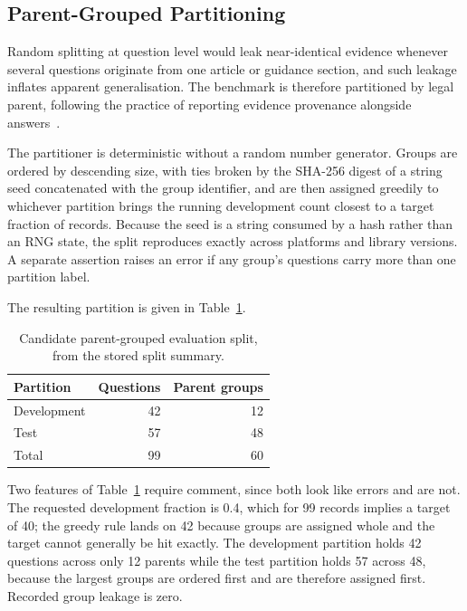 \subsection{Parent-Grouped Partitioning}

Random splitting at question level would leak near-identical evidence whenever several questions originate from one article or guidance section, and such leakage inflates apparent generalisation. The benchmark is therefore partitioned by legal parent, following the practice of reporting evidence provenance alongside answers~\cite{petroni2021kilt}.

The partitioner is deterministic without a random number generator. Groups are ordered by descending size, with ties broken by the SHA-256 digest of a string seed concatenated with the group identifier, and are then assigned greedily to whichever partition brings the running development count closest to a target fraction of records. Because the seed is a string consumed by a hash rather than an RNG state, the split reproduces exactly across platforms and library versions. A separate assertion raises an error if any group's questions carry more than one partition label.

The resulting partition is given in Table~\ref{tab:split}.

\begin{table}[htbp]
  \centering
  \caption{Candidate parent-grouped evaluation split, from the stored split summary.}
  \label{tab:split}
  \begin{tabular}{lrr}
    \toprule
    \textbf{Partition} & \textbf{Questions} & \textbf{Parent groups} \\
    \midrule
    Development & 42 & 12 \\
    Test & 57 & 48 \\
    \midrule
    Total & 99 & 60 \\
    \bottomrule
  \end{tabular}
\end{table}

Two features of Table~\ref{tab:split} require comment, since both look like errors and are not. The requested development fraction is 0.4, which for 99 records implies a target of 40; the greedy rule lands on 42 because groups are assigned whole and the target cannot generally be hit exactly. The development partition holds 42 questions across only 12 parents while the test partition holds 57 across 48, because the largest groups are ordered first and are therefore assigned first. Recorded group leakage is zero.

